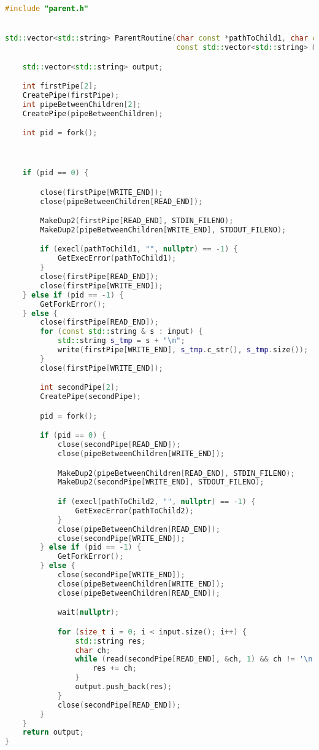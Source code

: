 \documentclass[pdf, unicode, 12pt, a4paper,oneside,fleqn]{article}
\begin{document}
\begin{lstlisting}[language=C++]
#include "parent.h"


std::vector<std::string> ParentRoutine(char const *pathToChild1, char const *pathToChild2,
                                       const std::vector<std::string> &input){

    std::vector<std::string> output;

    int firstPipe[2];
    CreatePipe(firstPipe);
    int pipeBetweenChildren[2];
    CreatePipe(pipeBetweenChildren);

    int pid = fork();



    if (pid == 0) {

        close(firstPipe[WRITE_END]);
        close(pipeBetweenChildren[READ_END]);

        MakeDup2(firstPipe[READ_END], STDIN_FILENO);
        MakeDup2(pipeBetweenChildren[WRITE_END], STDOUT_FILENO);

        if (execl(pathToChild1, "", nullptr) == -1) {
            GetExecError(pathToChild1);
        }
        close(firstPipe[READ_END]);
        close(firstPipe[WRITE_END]);
    } else if (pid == -1) {
        GetForkError();
    } else {
        close(firstPipe[READ_END]);
        for (const std::string & s : input) {
            std::string s_tmp = s + "\n";
            write(firstPipe[WRITE_END], s_tmp.c_str(), s_tmp.size());
        }
        close(firstPipe[WRITE_END]);

        int secondPipe[2];
        CreatePipe(secondPipe);

        pid = fork();

        if (pid == 0) {
            close(secondPipe[READ_END]);
            close(pipeBetweenChildren[WRITE_END]);

            MakeDup2(pipeBetweenChildren[READ_END], STDIN_FILENO);
            MakeDup2(secondPipe[WRITE_END], STDOUT_FILENO);

            if (execl(pathToChild2, "", nullptr) == -1) {
                GetExecError(pathToChild2);
            }
            close(pipeBetweenChildren[READ_END]);
            close(secondPipe[WRITE_END]);
        } else if (pid == -1) {
            GetForkError();
        } else {
            close(secondPipe[WRITE_END]);
            close(pipeBetweenChildren[WRITE_END]);
            close(pipeBetweenChildren[READ_END]);

            wait(nullptr);

            for (size_t i = 0; i < input.size(); i++) {
                std::string res;
                char ch;
                while (read(secondPipe[READ_END], &ch, 1) && ch != '\n'){
                    res += ch;
                }
                output.push_back(res);
            }
            close(secondPipe[READ_END]);
        }
    }
    return output;
}
\end{lstlisting}
\end{document}
